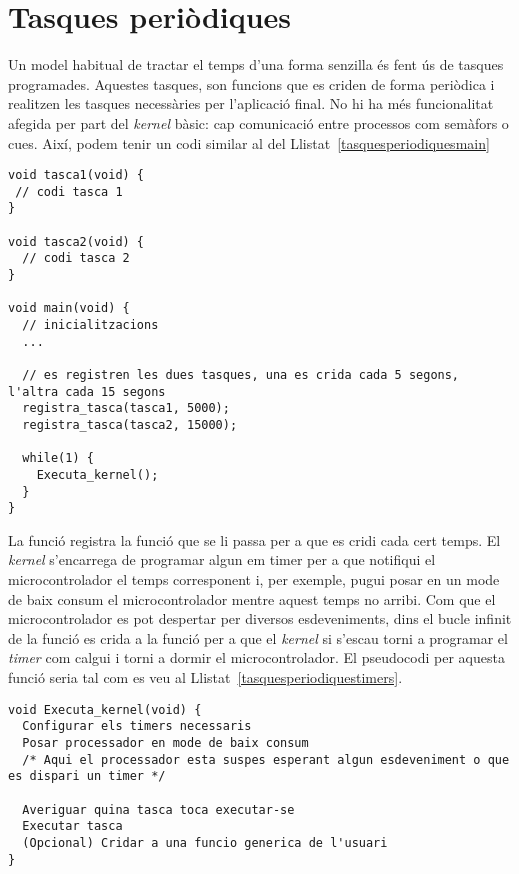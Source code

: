 \section{Tasques periòdiques}
\label{sec:tasquesperiodiques}

Un model habitual de tractar el temps d'una forma senzilla és fent ús de tasques programades. Aquestes tasques, son funcions que es criden de forma periòdica i realitzen les tasques necessàries per l'aplicació final. No hi ha més funcionalitat afegida per part del {\em kernel} bàsic: cap comunicació entre processos com semàfors o cues. Així, podem tenir un codi similar al del Llistat~\ref{tasquesperiodiquesmain}

\begin{lstlisting}[style=customc,caption={Estructura bàsica de les tasques programades},label=tasquesperiodiquesmain]
void tasca1(void) {
 // codi tasca 1
}

void tasca2(void) {
  // codi tasca 2
}

void main(void) {
  // inicialitzacions
  ...
  
  // es registren les dues tasques, una es crida cada 5 segons, l'altra cada 15 segons
  registra_tasca(tasca1, 5000);
  registra_tasca(tasca2, 15000);

  while(1) {
    Executa_kernel();
  }
}
\end{lstlisting}

La funció  registra la funció que se li passa per a que es cridi cada cert temps. El {\em kernel} s'encarrega de programar algun {em timer} per a que notifiqui el microcontrolador el temps corresponent i, per exemple, pugui posar en un mode de baix consum el microcontrolador mentre aquest temps no arribi.
Com que el microcontrolador es pot despertar per diversos esdeveniments, dins el bucle infinit de la funció  es crida a la funció per a que el {\em kernel} si s'escau torni a programar el {\em timer} com calgui i torni a dormir el microcontrolador. El pseudocodi per aquesta funció seria tal com es veu al Llistat~\ref{tasquesperiodiquestimers}.

\begin{lstlisting}[style=customc,caption={Estructura bàsica de la funció Executa\_kernel()},label=tasquesperiodiquestimers]
void Executa_kernel(void) {
  Configurar els timers necessaris
  Posar processador en mode de baix consum
  /* Aqui el processador esta suspes esperant algun esdeveniment o que es dispari un timer */

  Averiguar quina tasca toca executar-se
  Executar tasca 
  (Opcional) Cridar a una funcio generica de l'usuari
}
\end{lstlisting}




